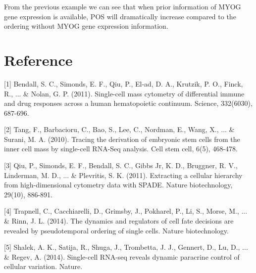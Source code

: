 \documentclass[10pt,oneside]{article}\usepackage[]{graphicx}\usepackage[]{color}
\begin{document}
From the previous example we can see that when prior information of MYOG gene expression is available, POS will dramatically increase compared to the ordering without MYOG gene expression information.

\section{Reference}
[1] Bendall, S. C., Simonds, E. F., Qiu, P., El-ad, D. A., Krutzik, P. O., Finck, R., ... \& Nolan, G. P. (2011). Single-cell mass cytometry of differential immune and drug responses across a human hematopoietic continuum. Science, 332(6030), 687-696.

[2] Tang, F., Barbacioru, C., Bao, S., Lee, C., Nordman, E., Wang, X., ... \& Surani, M. A. (2010). Tracing the derivation of embryonic stem cells from the inner cell mass by single-cell RNA-Seq analysis. Cell stem cell, 6(5), 468-478.

[3] Qiu, P., Simonds, E. F., Bendall, S. C., Gibbs Jr, K. D., Bruggner, R. V., Linderman, M. D., ... \& Plevritis, S. K. (2011). Extracting a cellular hierarchy from high-dimensional cytometry data with SPADE. Nature biotechnology, 29(10), 886-891.

[4] Trapnell, C., Cacchiarelli, D., Grimsby, J., Pokharel, P., Li, S., Morse, M., ... \& Rinn, J. L. (2014). The dynamics and regulators of cell fate decisions are revealed by pseudotemporal ordering of single cells. Nature biotechnology.

[5] Shalek, A. K., Satija, R., Shuga, J., Trombetta, J. J., Gennert, D., Lu, D., ... \& Regev, A. (2014). Single-cell RNA-seq reveals dynamic paracrine control of cellular variation. Nature.
\end{document}
